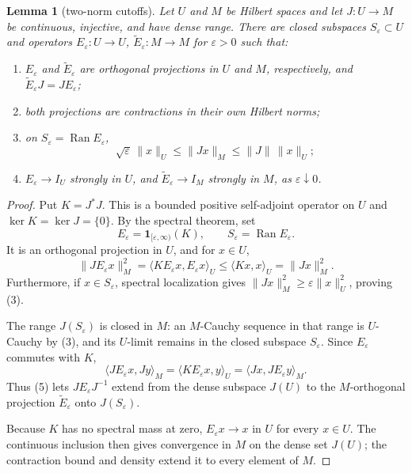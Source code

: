 \documentclass[11pt]{article}
\newtheorem{lemma}[theorem]{Lemma}
\newcommand{\Ran}{\operatorname{Ran}}
\begin{document}
\begin{lemma}[two-norm cutoffs]\label{lem:cutoff}
Let $U$ and $M$ be Hilbert spaces and let $J:U\to M$ be continuous,
injective, and have dense range.  There are closed subspaces
$S_\varepsilon\subset U$ and operators $E_\varepsilon:U\to U$,
$\widetilde E_\varepsilon:M\to M$ for $\varepsilon>0$ such that:
\begin{enumerate}
\item $E_\varepsilon$ and $\widetilde E_\varepsilon$ are orthogonal
projections in $U$ and $M$, respectively, and
$\widetilde E_\varepsilon J=JE_\varepsilon$;
\item both projections are contractions in their own Hilbert norms;
\item on $S_\varepsilon=\Ran E_\varepsilon$,
\[
 \sqrt\varepsilon\,\|x\|_U\leq\|Jx\|_M
 \leq\|J\|\,\|x\|_U;
 \tag{3}
\]
\item $E_\varepsilon\to I_U$ strongly in $U$, and
$\widetilde E_\varepsilon\to I_M$ strongly in $M$, as
$\varepsilon\downarrow0$.
\end{enumerate}
\end{lemma}

\begin{proof}
Put $K=J^*J$.  This is a bounded positive self-adjoint operator on $U$ and
$\ker K=\ker J=\{0\}$.  By the spectral theorem, set
\[
 E_\varepsilon=\mathbf 1_{[\varepsilon,\infty)}(K),
 \qquad S_\varepsilon=\Ran E_\varepsilon.
 \tag{4}
\]
It is an orthogonal projection in $U$, and for $x\in U$,
\[
 \|JE_\varepsilon x\|_M^2
 =\langle KE_\varepsilon x,E_\varepsilon x\rangle_U
 \leq \langle Kx,x\rangle_U=\|Jx\|_M^2.
 \tag{5}
\]
Furthermore, if $x\in S_\varepsilon$, spectral localization gives
$\|Jx\|_M^2\geq\varepsilon\|x\|_U^2$, proving (3).

The range $J(S_\varepsilon)$ is closed in $M$: an $M$-Cauchy sequence in
that range is $U$-Cauchy by (3), and its $U$-limit remains in the closed
subspace $S_\varepsilon$.  Since $E_\varepsilon$ commutes with $K$,
\[
 \langle JE_\varepsilon x,Jy\rangle_M
 =\langle K E_\varepsilon x,y\rangle_U
 =\langle Jx,J E_\varepsilon y\rangle_M.
 \tag{6}
\]
Thus (5) lets $JE_\varepsilon J^{-1}$ extend from the dense subspace
$J(U)$ to the $M$-orthogonal projection $\widetilde E_\varepsilon$ onto
$J(S_\varepsilon)$.

Because $K$ has no spectral mass at zero,
$E_\varepsilon x\to x$ in $U$ for every $x\in U$.  The continuous inclusion
then gives convergence in $M$ on the dense set $J(U)$; the contraction bound
and density extend it to every element of $M$.
\end{proof}
\end{document}
